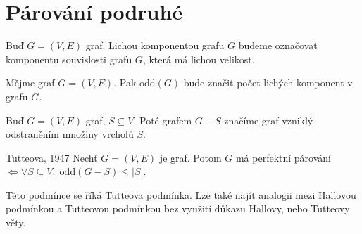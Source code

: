\section{Párování podruhé}

\begin{t_definition}
  Buď $G=(V,E)$ graf. Lichou komponentou grafu $G$ budeme označovat komponentu souvislosti grafu $G$, která má lichou velikost.
\end{t_definition}

\begin{t_definition}
  Mějme graf $G=(V,E)$. Pak $\mathrm{odd}(G)$ bude značit počet lichých komponent v grafu $G$.
\end{t_definition}

\begin{t_definition}
  Buď $G=(V,E)$ graf, $S \subseteq V$. Poté grafem $G-S$ značíme graf vzniklý odstraněním množiny vrcholů $S$.
\end{t_definition}

\begin{t_theorem}{Tutteova, 1947}
  Nechť $G=(V,E)$ je graf. Potom $G$ má perfektní párování $\iff \forall S \subseteq V : \; \mathrm{odd}(G-S) \leq |S|$.
\end{t_theorem}
\begin{t_remark}
  Této podmínce se říká Tutteova podmínka. Lze také najít analogii mezi Hallovou podmínkou a Tutteovou podmínkou bez využití důkazu Hallovy, nebo Tutteovy věty.
\end{t_remark}

